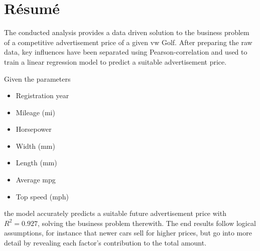 \section{Résumé}

The conducted analysis provides a data driven solution to the business problem of a competitive advertisement price of a given \ac{vw} Golf.
After preparing the raw data, key influences have been separated using Pearson-correlation and used to train a linear regression model to
predict a suitable advertisement price.
\par
Given the parameters 
\begin{itemize}
    \item Registration year
    \item Mileage (mi)
    \item Horsepower
    \item Width (mm)
    \item Length (mm)
    \item Average mpg
    \item Top speed (mph)
\end{itemize}
the model accurately predicts a suitable future advertisement price with $R^2 = 0.927$, solving the business problem therewith.
The end results follow logical assumptions, for instance that newer cars sell for higher prices,
but go into more detail by revealing each factor's contribution to the total amount. 


